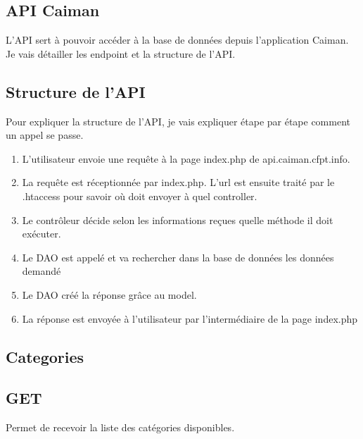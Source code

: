 \documentclass[a4paper,12pt,french]{sphinxmanual}
\begin{document}
\subsection{API Caiman}
\label{\detokenize{fonctionnelle:api-caiman}}
\sphinxAtStartPar
L’API sert à pouvoir accéder à la base de données depuis l’application Caiman. Je vais détailler les endpoint et la structure de l’API.


\subsection{Structure de l’API}
\label{\detokenize{fonctionnelle:structure-de-lapi}}
\sphinxAtStartPar
{}

\sphinxAtStartPar
Pour expliquer la structure de l’API, je vais expliquer étape par étape comment un appel se passe.
\begin{enumerate}
%
\item {} 
\sphinxAtStartPar
L’utilisateur envoie une requête à la page index.php de api.caiman.cfpt.info.

\item {} 
\sphinxAtStartPar
La requête est réceptionnée par index.php. L’url est ensuite traité par le .htaccess pour savoir où doit envoyer à quel controller.

\item {} 
\sphinxAtStartPar
Le contrôleur décide selon les informations reçues quelle méthode il doit exécuter.

\item {} 
\sphinxAtStartPar
Le DAO est appelé et va rechercher dans la base de données les données demandé

\item {} 
\sphinxAtStartPar
Le DAO créé la réponse grâce au model.

\item {} 
\sphinxAtStartPar
La réponse est envoyée à l’utilisateur par l’intermédiaire de la page index.php

\end{enumerate}


\subsection{Categories}
\label{\detokenize{fonctionnelle:categories}}

\subsection{GET}
\label{\detokenize{fonctionnelle:get}}
\sphinxAtStartPar
Permet de recevoir la liste des catégories disponibles.
\end{document}
